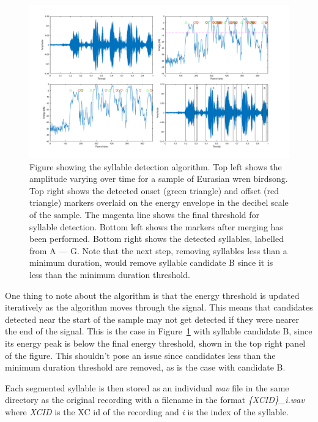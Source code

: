 \begin{figure}[ht]
  \centering
  \includegraphics[width=\textwidth]{figures/syllable_segmentation.png}
  \caption{Figure showing the syllable detection algorithm. Top left shows the
    amplitude varying over time for a sample of Eurasian wren birdsong. Top
    right shows the detected onset (green triangle) and offset (red triangle)
    markers overlaid on the energy envelope in the decibel scale
    of the sample. The magenta line shows the final threshold for syllable
    detection. Bottom left shows the markers after merging has been performed.
    Bottom right shows the detected syllables, labelled from A --- G. Note that
  the next step, removing syllables less than a minimum duration, would remove
syllable candidate B since it is less than the minimum duration
threshold.}\label{fig:syllable_segmentation}
\end{figure}

One thing to note about the algorithm is that the energy threshold is updated
iteratively as the algorithm moves through the signal. This means that
candidates detected near the start of the sample may not get detected if they
were nearer the end of the signal. This is the case in
Figure~\ref{fig:syllable_segmentation} with syllable candidate B, since its
energy peak is below the final energy threshold, shown in the top right panel of
the figure. This shouldn't pose an issue since candidates less than the minimum
duration threshold are removed, as is the case with candidate B.

Each segmented syllable is then stored as an individual \textit{wav} file in the
same directory as the original recording with a filename in the format
\textit{\{XCID\}\_i.wav} where \textit{XCID} is the XC id of the recording and
\textit{i} is the index of the syllable.


